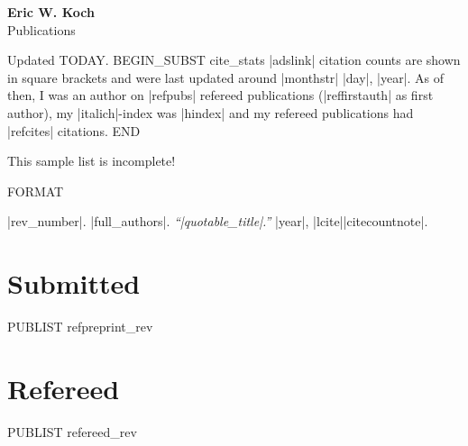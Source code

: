 \documentclass[letterpaper,11pt]{article}
\newcommand{\myname}{Eric W. Koch}
\newcommand{\mysite}{e-koch.github.io}
\newenvironment{publist}{
  \begingroup
  \raggedright
  \begin{description}[leftmargin=4ex,style=sameline]
}{
  \end{description}
  \endgroup
}
\begin{document}
\pagestyle{fancy}
\lhead{} \chead{} \rhead{} \renewcommand{\headrule}{\relax}
\cfoot{\thepage/\pageref*{LastPage}}
\rfoot{\textsc{\myname}}

\begin{center}
\textbf{\Large \myname} \\
{\large Publications}
\end{center}



\noindent Updated %
TODAY.
BEGIN_SUBST cite_stats
|adslink| citation counts are shown in square brackets and were last updated
around |monthstr| |day|, |year|. As of then, I was an author on |refpubs|
refereed publications (|reffirstauth| as first author), my |italich|-index was
|hindex| and my refereed publications had |refcites| citations.
END

This sample list is incomplete!

FORMAT \item[|rev_number|.] |full_authors|. \textit{``|quotable_title|.''} |year|, |lcite||citecountnote|.

\section*{Submitted}

\begin{publist}
PUBLIST refpreprint_rev
\end{publist}

\section*{Refereed}

\begin{publist}
PUBLIST refereed_rev
\end{publist}


\end{document}
